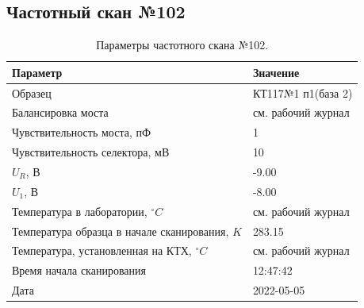 \subsection{Частотный скан №102}
\begin{table}[!ht]
    \centering
    \caption{Параметры частотного скана №102.}
    \begin{tabular}{|l|l|}
        \hline
        Параметр                                       & Значение                  \\ \hline
        Образец                                        & КТ117№1 п1(база 2)        \\ \hline
        Балансировка моста                             & см. рабочий журнал        \\ \hline
        Чувствительность моста, пФ                     & 1                         \\ \hline
        Чувствительность селектора, мВ                 & 10                        \\ \hline
        $U_R$, В                                       & -9.00                     \\ \hline
        $U_1$, В                                       & -8.00                     \\ \hline
        Температура в лаборатории, $^\circ C$          & см. рабочий журнал        \\ \hline
        Температура образца в начале сканирования, $K$ & 283.15                    \\ \hline
        Температура, установленная на КТХ, $^\circ C$  & см. рабочий журнал        \\ \hline
        Время начала сканирования                      & 12:47:42                  \\ \hline
        Дата                                           & 2022-05-05                \\ \hline
    \end{tabular}
    \label{table:frequency_scan_102}
\end{table}

